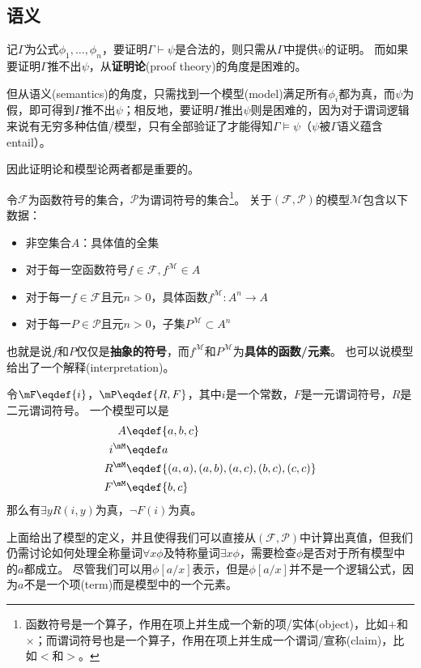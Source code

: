 \subsection{语义}
记$\Gamma$为公式$\phi_1,\ldots,\phi_n$，要证明$\Gamma\vdash\psi$是合法的，则只需从$\Gamma$中提供$\psi$的证明。
而如果要证明$\Gamma$推不出$\psi$，从\textbf{证明论}(proof theory)的角度是困难的。

但从语义(semantics)的角度，只需找到一个模型(model)满足所有$\phi_i$都为真，而$\psi$为假，即可得到$\Gamma$推不出$\psi$；相反地，要证明$\Gamma$推出$\psi$则是困难的，因为对于谓词逻辑来说有无穷多种估值/模型，只有全部验证了才能得知$\Gamma\models\psi$（$\psi$被$\Gamma$语义蕴含entail）。

因此证明论和模型论两者都是重要的。

\begin{definition}[模型(model)]
令$\mathcal{F}$为函数符号的集合，$\mathcal{P}$为谓词符号的集合\footnote{函数符号是一个算子，作用在项上并生成一个新的项/实体(object)，比如$+$和$\times$；而谓词符号也是一个算子，作用在项上并生成一个谓词/宣称(claim)，比如$<$和$>$。}。
关于$(\mathcal{F},\mathcal{P})$的模型$\mathcal{M}$包含以下数据：
\begin{itemize}
	\item 非空集合$A$：具体值的全集
	\item 对于每一空函数符号$f\in\mathcal{F},f^{\mathcal{M}}\in A$
	\item 对于每一$f\in\mathcal{F}$且元$n>0$，具体函数$f^{\mathcal{M}}:A^n\to A$
	\item 对于每一$P\in\mathcal{P}$且元$n>0$，子集$P^\mathcal{M}\subset A^n$
\end{itemize}
也就是说$f$和$P$仅仅是\textbf{抽象的符号}，而$f^{\mathcal{M}}$和$P^{\mathcal{M}}$为\textbf{具体的函数/元素}。
也可以说模型给出了一个解释(interpretation)。
\end{definition}
\begin{example}
令$\mF\eqdef\{i\}$，$\mP\eqdef\{R,F\}$，其中$i$是一个常数，$F$是一元谓词符号，$R$是二元谓词符号。
一个模型可以是
\[\begin{aligned}
A &\eqdef\{a,b,c\}\\
i^{\mM} &\eqdef a\\
R^{\mM} &\eqdef\{(a,a),(a,b),(a,c),(b,c),(c,c)\}\\
F^{\mM} &\eqdef\{b,c\}
\end{aligned}\]
那么有$\exists yR(i,y)$为真，$\lnot F(i)$为真。
\end{example}

上面给出了模型的定义，并且使得我们可以直接从$(\mathcal{F},\mathcal{P})$中计算出真值，但我们仍需讨论如何处理全称量词$\forall x\phi$及特称量词$\exists x\phi$，需要检查$\phi$是否对于所有模型中的$a$都成立。
尽管我们可以用$\phi[a/x]$表示，但是$\phi[a/x]$并不是一个逻辑公式，因为$a$不是一个项(term)而是模型中的一个元素。

